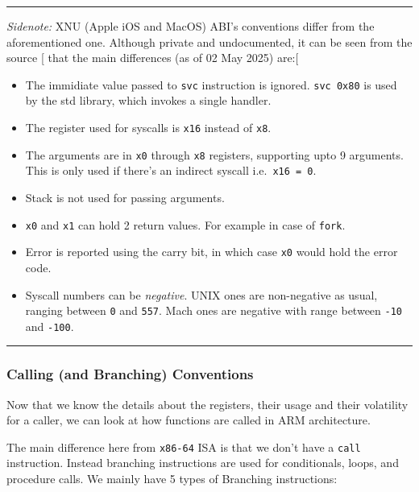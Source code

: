 \documentclass[a4paper, nobind]{templates/ociamthesis}
\providecommand{\tightlist}{%
  \setlength{\itemsep}{0pt}\setlength{\parskip}{0pt}}
\begin{document}
\begin{center}\rule{0.5\linewidth}{0.5pt}\end{center}

\emph{Sidenote:} XNU (Apple iOS and MacOS) ABI's conventions differ from the aforementioned one.
Although private and undocumented, it can be seen from the source {[}\citeproc{ref-apple-oss}{14}{]} that
the main differences (as of 02 May 2025) are:{[}\citeproc{ref-so-xnu-abi}{23}{]}

\begin{itemize}
\tightlist
\item
  The immidiate value passed to \texttt{svc} instruction is ignored. \texttt{svc\ 0x80} is used
  by the std library, which invokes a single handler.
\item
  The register used for syscalls is \texttt{x16} instead of \texttt{x8}.
\item
  The arguments are in \texttt{x0} through \texttt{x8} registers, supporting upto 9 arguments.
  This is only used if there's an indirect syscall i.e.~\texttt{x16\ =\ 0}.
\item
  Stack is not used for passing arguments.
\item
  \texttt{x0} and \texttt{x1} can hold 2 return values. For example in case of \texttt{fork}.
\item
  Error is reported using the carry bit, in which case \texttt{x0} would hold
  the error code.
\item
  Syscall numbers can be \emph{negative}.
  UNIX ones are non-negative as usual, ranging between \texttt{0} and \texttt{557}.
  Mach ones are negative with range between \texttt{-10} and \texttt{-100}.
\end{itemize}

\begin{center}\rule{0.5\linewidth}{0.5pt}\end{center}

\subsubsection{Calling (and Branching) Conventions}\label{calling-and-branching-conventions}

Now that we know the details about the registers, their usage and their volatility for a caller,
we can look at how functions are called in ARM architecture.

The main difference here from \texttt{x86-64} ISA is that we don't have a \texttt{call} instruction.
Instead branching instructions are used for conditionals, loops, and procedure calls.
We mainly have 5 types of Branching instructions:
\end{document}
